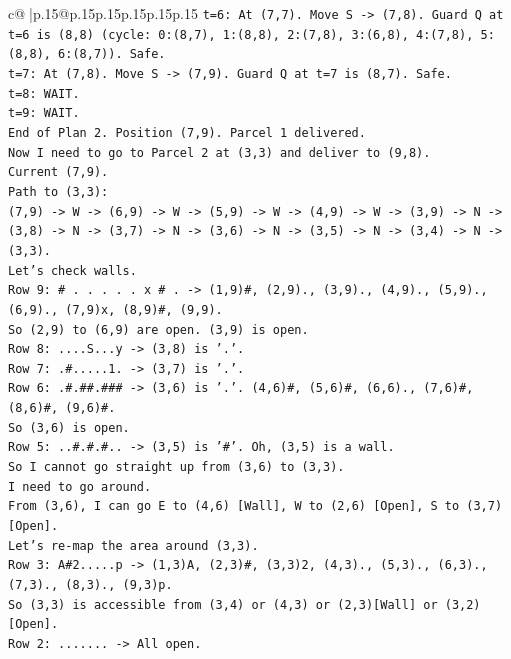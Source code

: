 \documentclass{article}
\begin{document}
{\begin{supertabular}{c@{$\;$}|p{.15\linewidth}@{}p{.15\linewidth}p{.15\linewidth}p{.15\linewidth}p{.15\linewidth}p{.15\linewidth}}
{{{\texttt{t=6: At (7,7). Move S {-}> (7,8). Guard Q at t=6 is (8,8) (cycle: 0:(8,7), 1:(8,8), 2:(7,8), 3:(6,8), 4:(7,8), 5:(8,8), 6:(8,7)). Safe.} \\
\texttt{t=7: At (7,8). Move S {-}> (7,9). Guard Q at t=7 is (8,7). Safe.} \\
\texttt{t=8: WAIT.} \\
\texttt{t=9: WAIT.} \\
\texttt{End of Plan 2. Position (7,9). Parcel 1 delivered.} \\
\texttt{Now I need to go to Parcel 2 at (3,3) and deliver to (9,8).} \\
\texttt{Current (7,9).} \\
\texttt{Path to (3,3):} \\
\texttt{(7,9) {-}> W {-}> (6,9) {-}> W {-}> (5,9) {-}> W {-}> (4,9) {-}> W {-}> (3,9) {-}> N {-}> (3,8) {-}> N {-}> (3,7) {-}> N {-}> (3,6) {-}> N {-}> (3,5) {-}> N {-}> (3,4) {-}> N {-}> (3,3).} \\
\texttt{Let's check walls.} \\
\texttt{Row 9: \# . . . . . x \# . {-}> (1,9)\#, (2,9)., (3,9)., (4,9)., (5,9)., (6,9)., (7,9)x, (8,9)\#, (9,9).} \\
\texttt{So (2,9) to (6,9) are open. (3,9) is open.} \\
\texttt{Row 8: ....S...y {-}> (3,8) is '.'.} \\
\texttt{Row 7: .\#.....1. {-}> (3,7) is '.'.} \\
\texttt{Row 6: .\#.\#\#.\#\#\# {-}> (3,6) is '.'. (4,6)\#, (5,6)\#, (6,6)., (7,6)\#, (8,6)\#, (9,6)\#.} \\
\texttt{So (3,6) is open.} \\
\texttt{Row 5: ..\#.\#.\#.. {-}> (3,5) is '\#'. Oh, (3,5) is a wall.} \\
\texttt{So I cannot go straight up from (3,6) to (3,3).} \\
\texttt{I need to go around.} \\
\texttt{From (3,6), I can go E to (4,6) {[}Wall{]}, W to (2,6) {[}Open{]}, S to (3,7) {[}Open{]}.} \\
\texttt{Let's re{-}map the area around (3,3).} \\
\texttt{Row 3: A\#2.....p {-}> (1,3)A, (2,3)\#, (3,3)2, (4,3)., (5,3)., (6,3)., (7,3)., (8,3)., (9,3)p.} \\
\texttt{So (3,3) is accessible from (3,4) or (4,3) or (2,3){[}Wall{]} or (3,2){[}Open{]}.} \\
\texttt{Row 2: ....... {-}> All open.} \\
}}}
\end{supertabular}}
\end{document}

